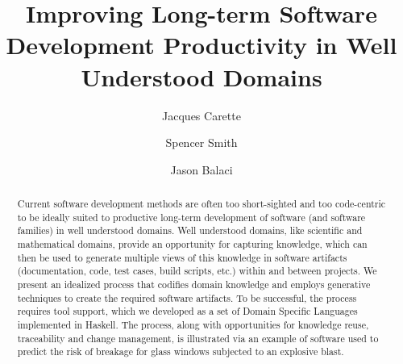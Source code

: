 \documentclass[sigconf,review]{acmart}
\begin{document}
\title{Improving Long-term Software Development Productivity in Well Understood Domains}

\author{Jacques Carette}

\author{Spencer Smith}

\author{Jason Balaci}

\begin{abstract}
  Current software development methods are often too short-sighted and too
  code-centric to be ideally suited to productive long-term development of
  software (and software families) in well understood domains.  Well understood
  domains, like scientific and mathematical domains, provide an opportunity for
  capturing knowledge, which can then be used to generate multiple views of this
  knowledge in software artifacts (documentation, code, test cases, build
  scripts, etc.) within and between projects.  %
  We present an idealized process that codifies domain knowledge and employs
  generative techniques to create the required software artifacts.  To be
  successful, the process requires tool support, which we developed as a set of
  Domain Specific Languages implemented in Haskell.  The process, along with
  opportunities for knowledge reuse, traceability and change management, is
  illustrated via an example of software used to predict the risk of breakage
  for glass windows subjected to an explosive blast.
\end{abstract}
\end{document}
